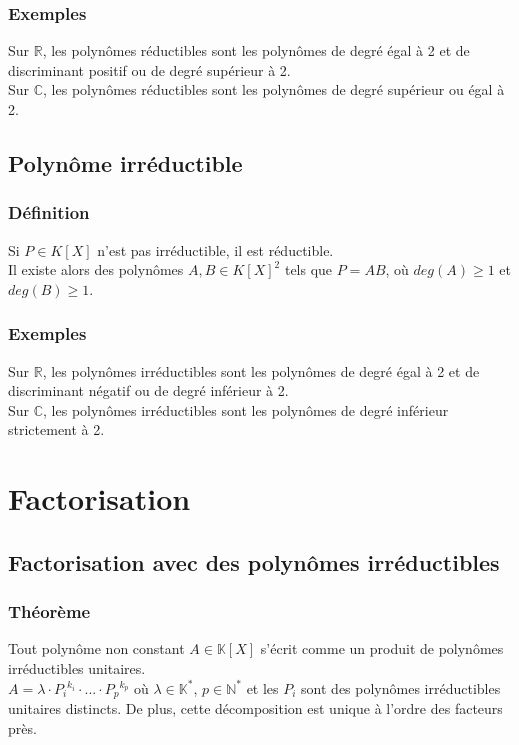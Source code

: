 \documentclass[a4paper,10pt]{book} %
\newcommand{\R}{\mathbb{R}}
\newcommand{\N}{\mathbb{N}}
\newcommand{\C}{\mathbb{C}}
\newcommand{\K}{\mathbb{K}}
\begin{document}
\subsubsection{Exemples}
Sur $\R$, les polynômes réductibles sont les polynômes de degré égal à 2 et de discriminant positif ou de degré supérieur à 2.\\
Sur $\C$, les polynômes réductibles sont les polynômes de degré supérieur ou égal à 2.\\

\subsection{Polynôme irréductible}
\subsubsection{Définition}
Si $P\in K[X]$ n'est pas irréductible, il est réductible.\\
Il existe alors des polynômes $A,B\in K[X]^{2}$ tels que $P=AB$, où $deg(A)\geq 1$ et $deg(B)\geq 1$.

\subsubsection{Exemples}
Sur $\R$, les polynômes irréductibles sont les polynômes de degré égal à 2 et de discriminant négatif ou de degré inférieur à 2.\\
Sur $\C$, les polynômes irréductibles sont les polynômes de degré inférieur strictement à 2.

\newpage

\section{Factorisation}
\subsection{Factorisation avec des polynômes irréductibles}
\subsubsection{Théorème}
Tout polynôme non constant $A\in \K[X]$ s'écrit comme un produit de polynômes irréductibles unitaires.\\
$A=\lambda \cdot P_{i}{}^{k_{i}}\cdot...\cdot P_{p}{}^{k_{p}}$ où $\lambda\in \K^{*}$, $p\in \N^{*}$ et les $P_{i}$ sont des polynômes irréductibles unitaires distincts. De plus, cette décomposition est unique à l'ordre des facteurs près.
\end{document}
